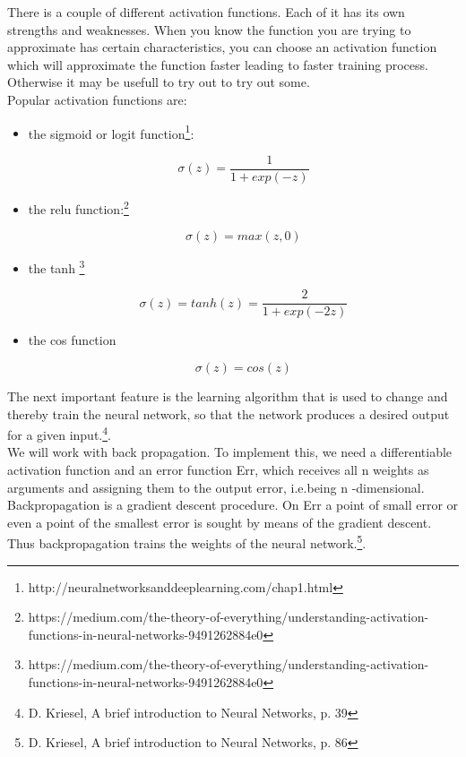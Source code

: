 \documentclass[12pt]{article}
\begin{document}
   There is a couple of different activation functions. Each of it has its own strengths and weaknesses. When you know the function you are trying to approximate has certain characteristics, you can choose an activation function which will approximate the function faster leading to faster training process. Otherwise it may be usefull to try out to try out some.\\
   
   Popular activation functions are:
   \begin{itemize}
   	\item  the sigmoid or logit function\footnote{http://neuralnetworksanddeeplearning.com/chap1.html}: 
   
  \[ \sigma(z) = \frac{1}{1+exp(-z)} \]
  
  \item the relu function:\footnote{https://medium.com/the-theory-of-everything/understanding-activation-functions-in-neural-networks-9491262884e0}
  
  \[ \sigma(z) = max(z,0)\]
  
  \item the tanh \footnote{https://medium.com/the-theory-of-everything/understanding-activation-functions-in-neural-networks-9491262884e0}
  
  \[ \sigma(z) = tanh(z) = \frac{2}{1+exp(-2z)} \]
  
  \item the cos function
  
  \[ \sigma(z) = cos(z)\]
  
  \end{itemize}
  
  
The  next important feature is the learning algorithm that is used to change and thereby train the neural network, so that the network produces a desired output for a given input.\footnote{D. Kriesel, A brief introduction to Neural Networks, p. 39}. \\
  
We will work with back propagation. To implement this, we need a differentiable activation function and an error function Err, which receives all n weights as arguments and assigning them to the output error, i.e.being
n -dimensional. Backpropagation is a gradient descent procedure. On Err a point of small error or even a point of the smallest error is sought by means of the gradient descent. Thus backpropagation trains the weights of the neural network.\footnote{D. Kriesel, A brief introduction to Neural Networks, p. 86}. \\
   
\end{document}
